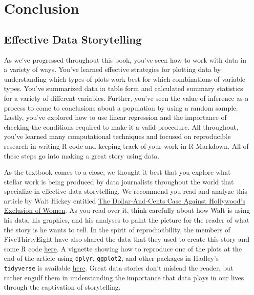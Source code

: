 \documentclass[]{tufte-book}
\theoremstyle{definition}
\theoremstyle{definition}
\theoremstyle{remark}
\begin{document}
\part{Conclusion}\label{part-conclusion}

\chapter{Effective Data Storytelling}\label{effective-data-storytelling}

As we've progressed throughout this book, you've seen how to work with
data in a variety of ways. You've learned effective strategies for
plotting data by understanding which types of plots work best for which
combinations of variable types. You've summarized data in table form and
calculated summary statistics for a variety of different variables.
Further, you've seen the value of inference as a process to come to
conclusions about a population by using a random sample. Lastly, you've
explored how to use linear regression and the importance of checking the
conditions required to make it a valid procedure. All throughout, you've
learned many computational techniques and focused on reproducible
research in writing R code and keeping track of your work in R Markdown.
All of these steps go into making a great story using data.

As the textbook comes to a close, we thought it best that you explore
what stellar work is being produced by data journalists throughout the
world that specialize in effective data storytelling. We recommend you
read and analyze this article by Walt Hickey entitled
\href{http://fivethirtyeight.com/features/the-dollar-and-cents-case-against-hollywoods-exclusion-of-women/}{The
Dollar-And-Cents Case Against Hollywood's Exclusion of Women}. As you
read over it, think carefully about how Walt is using his data, his
graphics, and his analyses to paint the picture for the reader of what
the story is he wants to tell. In the spirit of reproducibility, the
members of FiveThirtyEight have also shared the data that they used to
create this story and some R code
\href{https://github.com/fivethirtyeight/data/tree/master/bechdel}{here}.
A vignette showing how to reproduce one of the plots at the end of the
article using \texttt{dplyr}, \texttt{ggplot2}, and other packages in
Hadley's \texttt{tidyverse} is available
\href{https://cran.r-project.org/web/packages/fivethirtyeight/vignettes/bechdel.html}{here}.
Great data stories don't mislead the reader, but rather engulf them in
understanding the importance that data plays in our lives through the
captivation of storytelling.
\end{document}
